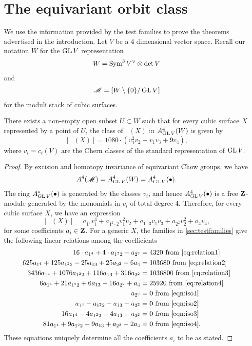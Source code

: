 \documentclass[11pt,reqno, letterpaper]{amsart}
\DeclareMathOperator{\Orb}{\overline{Orb}}
\numberwithin{equation}{section}
\begin{document}
\section{The equivariant orbit class}
\label{sec:tietogether}
We use the information provided by the test families to prove the theorems advertised in the introduction.
Let $V$ be a 4 dimensional vector space.
Recall our notation $W$ for the $\operatorname{GL} V$ representation 
\[W = \operatorname{Sym}^3V^\vee \otimes \det V\]
and
\[\mathscr M = \left[ W \setminus \{0\} / \operatorname{GL} V \right]\]
for the moduli stack of cubic surfaces.
\begin{theorem}\label{thm:eqvclass}
  There exists a non-empty open subset $U \subset W$ such that for every cubic surface $X$ represented by a point of $U$, the class of $\Orb(X)$ in $A^4_{\operatorname{GL} V}(W)$ is given by
  \[
    [\Orb(X)] = 1080 \cdot \left(v_{1}^{2}v_{2} - v_{1}v_{3}+ 9v_{4}\right),
  \]
  where $v_i = c_i(V)$ are the Chern classes of the standard representation of $\operatorname{GL} V$.
\end{theorem}
\begin{proof}
  By excision and homotopy invariance of equivariant Chow groups, we have
  \[ A^4(\mathscr M) = A^4_{\operatorname{GL} V}(W) = A^4_{\operatorname{GL} V}(\bullet).\]
  The ring $A^*_{\operatorname{GL} V}(\bullet)$ is generated by the classes $v_i$, and hence $A^4_{\operatorname{GL} V}(\bullet)$ is a free ${\bf Z}$-module generated by the monomials in $v_i$ of total degree 4.
  Therefore, for every cubic surface $X$, we have an expression
  \[[\Orb(X)] = a_{1^4}v_1^4 + a_{1^2\cdot 2} v_1^2v_2 + a_{1\cdot 3} v_1v_3 + a_{2^2}v_2^2 + a_4 v_4,\]
  for some coefficients $a_i \in {\bf Z}$.
  For a generic $X$, the families in \autoref{sec:testfamilies} give the following linear relations among the coefficients
  \begin{align*}
    16 \cdot a_{1^4} + 4 \cdot a_{1^2 2} + a_{2^2} &= 4320 \text{ from \eqref{eq:relation1}}\\
    625 a_{1^{4}} + 125 a_{1^{2}2} - 25a_{13} + 25a_{2^2} - 6 a_{4} &= 103680 \text{ from \eqref{eq:relation2}}\\
    3436a_{1^4} + 1076 a_{1^{2}2} +116 a_{13} + 316 a_{2^2} &= 1036800 \text{ from \eqref{eq:relation3}}\\
    6a_{1^{4}} + 21a_{1^{2}2}+6a_{13}+16a_{2^{2}}+a_{4} &= 25920 \text{ from \eqref{eq:relation4}}\\
    a_{2^2} &= 0  \text{ from \eqref{eqn:iso1}}\\
    a_{1^4} - a_{1^2 2}- a_{13} +  a_{2^2}  &= 0  \text{ from \eqref{eqn:iso2}}\\
    16a_{1^4} -4a_{1^2 2}- 4a_{13} +  a_{2^2}  &= 0  \text{ from \eqref{eqn:iso3}}\\
    81a_{1^4} +9a_{1^2 2}- 9a_{13} +  a_{2^2}-2a_4  &= 0  \text{ from \eqref{eqn:iso4}}.
  \end{align*}
  These equations uniquely determine all the coefficients $a_i$ to be as stated.
\end{proof}
\end{document}

